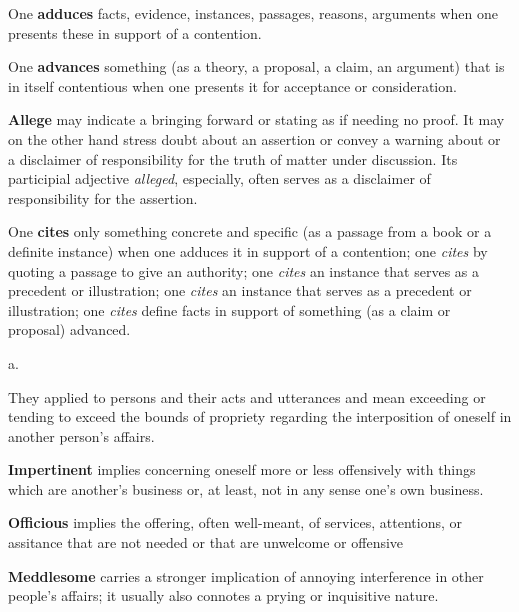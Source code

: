 \begin{description}[style=unboxed]
\begin{mynewitemize}
\item One \textbf{adduces} facts, evidence, instances, passages, reasons, arguments
when one presents these in support of a contention.
\item One \textbf{advances} something (as a theory, a proposal, a claim, an argument)
that is in itself contentious when one presents it for acceptance or consideration.
\item \textbf{Allege} may indicate a bringing forward or stating as if needing no proof.
It may on the other hand stress doubt about an assertion or convey a warning about
or a disclaimer of responsibility for the truth of matter under discussion. Its
participial adjective \textit{alleged}, especially, often serves as a disclaimer
of responsibility for the assertion.
\item One \textbf{cites} only something concrete and specific (as a passage from 
a book or a definite instance) when one adduces it in support of a contention;
one \textit{cites} by quoting a passage to give an authority; one \textit{cites}
an instance that serves as a precedent or illustration; one \textit{cites} an
instance that serves as a precedent or illustration; one \textit{cites} define facts
in support of something (as a claim or proposal) advanced.
\end{mynewitemize}

 a.

\begin{mynewitemize}

\item They applied to persons and their acts and utterances and mean exceeding or tending
to exceed the bounds of propriety regarding the interposition of oneself in
another person's affairs.

\item \textbf{Impertinent} implies concerning oneself more or less offensively with things
which are another's business or, at least, not in any sense one's own business.

\item \textbf{Officious} implies the offering, often well-meant, of services, attentions,
or assitance that are not needed or that are unwelcome or offensive

\item \textbf{Meddlesome} carries a stronger implication of annoying interference in other
people's affairs; it usually also connotes a prying or inquisitive nature.


\end{mynewitemize}
\end{description}
